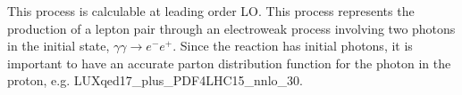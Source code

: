 \label{subsec:gg2lep}

This process is calculable at leading order LO.
This process represents the production of a lepton pair through an electroweak
process involving two photons in the initial state, $\gamma\gamma \to e^- e^+$.
Since the reaction has initial
photons, it is important to have an accurate parton distribution function for
the photon in the proton, e.g. LUXqed17\_plus\_PDF4LHC15\_nnlo\_30.
